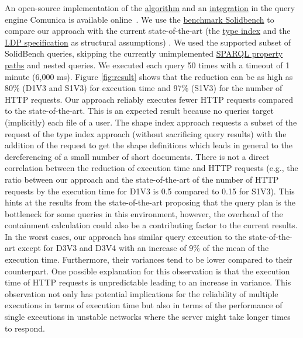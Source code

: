 An open-source implementation of the \href{https://github.com/constraintAutomaton/query-shape-detection}{algorithm} and an 
\href{https://github.com/constraintAutomaton/comunica-feature-link-traversal/tree/feature/shapeIndex}{integration} in the query engine 
Comunica \cite{taelman_iswc_resources_comunica_2018} is available online~.
We use the \href{https://github.com/SolidBench/SolidBench.js}{benchmark Solidbench} \cite{Taelman2023} to compare our approach with the current state-of-the-art (the \href{https://solid.github.io/type-indexes/}{type index} and the \href{https://www.w3.org/TR/ldp/}{LDP specification} as structural assumptions) \cite{Taelman2023}.
We used the supported subset of SolidBench queries, skipping the currently unimplemented \href{https://www.w3.org/TR/sparql11-query/#propertypaths}{SPARQL property paths} and nested queries.
We executed each query 50 times with a timeout of 1 minute (6,000 ms).
Figure \ref{fig:result} shows that the reduction can be as high as 80\% (D1V3 and S1V3) for execution time 
and 97\% (S1V3) for the number of HTTP requests.
Our approach reliably executes fewer HTTP requests compared to the state-of-the-art.
This is an expected result because no queries target (implicitly) each file of a user.
The shape index approach requests a subset of the request of the type index approach (without sacrificing query results) with the addition of the request to get the shape definitions which leads in general to the dereferencing of a small number of short documents.
There is not a direct correlation between the reduction of execution time and HTTP requests (e.g., the ratio 
between our approach and the state-of-the-art of the number of HTTP requests by the execution time for D1V3 is 0.5 compared to 0.15 for S1V3).
This hints at the results from the state-of-the-art \cite{Taelman2023} proposing that the query plan is the bottleneck for some queries in this environment,
however, the overhead of the containment calculation could also be a contributing factor to the current results.
In the worst cases, our approach  has similar query execution to the state-of-the-art except for D3V3 and D3V4 with an increase of 9\% of the mean of the execution time.
Furthermore, their variances tend to be lower compared to their counterpart. 
One possible explanation for this observation is that the execution time of HTTP requests is unpredictable \cite{hartig2016walking}
leading to an increase in variance.
This observation not only has potential implications for the reliability of multiple executions in terms of execution time
but also in terms of the performance of single executions in unstable networks where the server might take longer times to respond. 

